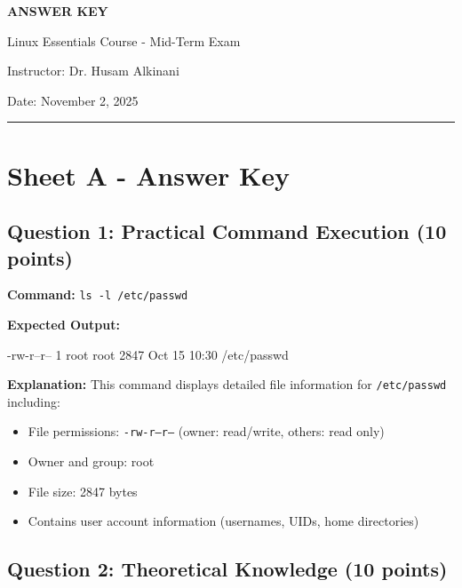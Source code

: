 \documentclass[a4paper,11pt]{article}
\begin{document}
\begin{center}
{\LARGE\textbf{\textcolor{primaryblue}{ANSWER KEY}}}

\vspace{3mm}
{\large Linux Essentials Course - Mid-Term Exam}

\vspace{2mm}
{\normalsize Instructor: Dr. Husam Alkinani}

\vspace{1mm}
{\normalsize Date: November 2, 2025}

\vspace{3mm}
\rule{\textwidth}{1pt}
\end{center}

\vspace{5mm}

\section*{Sheet A - Answer Key}

\subsection*{Question 1: Practical Command Execution (10 points)}

\textbf{Command:} \texttt{ls -l /etc/passwd}

\textbf{Expected Output:}
\begin{tcolorbox}[colback=lightgray,colframe=primaryblue,boxrule=0.5pt]
\ttfamily\small
-rw-r--r-- 1 root root 2847 Oct 15 10:30 /etc/passwd
\end{tcolorbox}

\textbf{Explanation:} This command displays detailed file information for \texttt{/etc/passwd} including:
\begin{itemize}[leftmargin=*,itemsep=2pt]
    \item File permissions: \texttt{-rw-r--r--} (owner: read/write, others: read only)
    \item Owner and group: root
    \item File size: 2847 bytes
    \item Contains user account information (usernames, UIDs, home directories)
\end{itemize}

\subsection*{Question 2: Theoretical Knowledge (10 points)}
\end{document}
